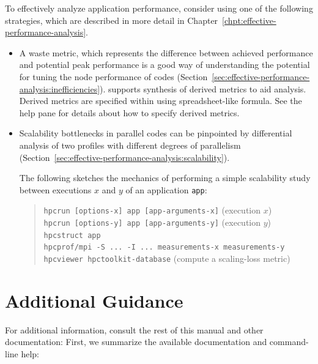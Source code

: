 \documentclass[11pt,letterpaper]{report}
\begin{document}
To effectively analyze application performance, consider using one of the following strategies, which are described in more detail in Chapter~\ref{chpt:effective-performance-analysis}.
\begin{itemize}
\item
A waste metric, which represents the difference between achieved performance and potential peak performance is a good way of understanding the potential for tuning the node performance of codes (Section~\ref{sec:effective-performance-analysis:inefficiencies}).
\hpcviewer{} supports synthesis of derived metrics to aid analysis.
Derived metrics are specified within \hpcviewer{} using spreadsheet-like formula.
See the \hpcviewer{} help pane for details about how to specify derived metrics.

\item
Scalability bottlenecks in parallel codes can be pinpointed by differential analysis of two profiles with different degrees of parallelism (Section~\ref{sec:effective-performance-analysis:scalability}).

The following sketches the mechanics of performing a simple scalability study between executions $x$ and $y$ of an application \texttt{app}:
\begin{quote}
  \verb|hpcrun [options-x] app [app-arguments-x]| \hfill (execution $x$) \\
  \verb|hpcrun [options-y] app [app-arguments-y]| \hfill (execution $y$) \\
  \verb|hpcstruct app| \\
  \verb|hpcprof/mpi -S ... -I ... measurements-x measurements-y| \\
  \verb|hpcviewer hpctoolkit-database| \hfill (compute a scaling-loss metric)
\end{quote}

\end{itemize}



\section{Additional Guidance}

For additional information, consult the rest of this manual and other documentation:
First, we summarize the available documentation and command-line help:
\end{document}
